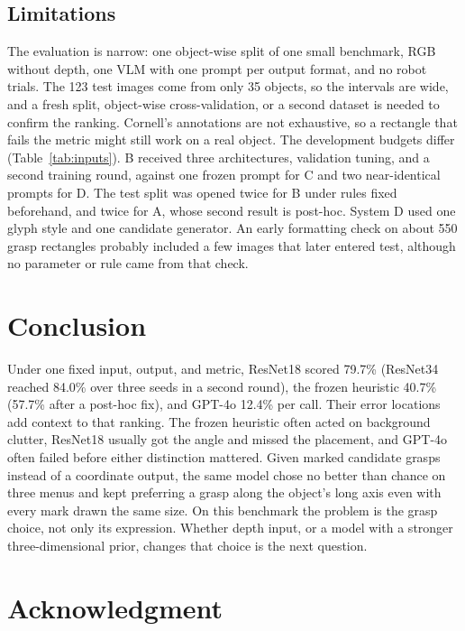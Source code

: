 \documentclass[10pt,conference,compsoc]{IEEEtran}
\begin{document}
\subsection{Limitations}

The evaluation is narrow: one object-wise split of one small benchmark, RGB
without depth, one VLM with one prompt per output format, and no robot
trials. The 123 test images come from only 35 objects, so the intervals are
wide, and a fresh split, object-wise cross-validation, or a second dataset is
needed to confirm the ranking. Cornell's annotations are not exhaustive, so a
rectangle that fails the metric might still work on a real object. The
development budgets differ (Table~\ref{tab:inputs}). B received three
architectures, validation tuning, and a second training round, against one
frozen prompt for C and two near-identical prompts for D. The test split was opened twice
for B under rules fixed beforehand, and twice for A, whose second result is
post-hoc. System D used one glyph style and one candidate generator. An early
formatting check on about 550 grasp rectangles probably included a few images
that later entered test, although no parameter or rule came from that check.

\section{Conclusion}

Under one fixed input, output, and metric, ResNet18 scored 79.7\% (ResNet34
reached 84.0\% over three seeds in a second round), the frozen heuristic 40.7\% (57.7\%
after a post-hoc fix), and GPT-4o 12.4\% per call. Their error locations add
context to that ranking. The frozen heuristic often acted on background
clutter, ResNet18 usually got the angle and missed the placement, and GPT-4o
often failed before either distinction mattered. Given marked candidate
grasps instead of a coordinate output, the same model chose no better than
chance on three menus and kept preferring a grasp along the object's long
axis even with every mark drawn the same size. On this benchmark the problem
is the grasp choice, not only its expression. Whether depth input, or a
model with a stronger three-dimensional prior, changes that choice is the
next question.

\section*{Acknowledgment}
\end{document}
